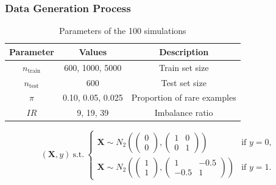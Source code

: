 \documentclass{beamer}
\begin{document}
\begin{frame}
  \frametitle{Data Generation Process}
  
  \small
  \begin{table}[h]
    \centering
    \begin{tabular}{|c|c|c|}
    \hline
    Parameter & Values & Description \\ 
    \hline
    $n_\text{train}$ & 600, 1000, 5000 & Train set size \\  
    $n_\text{test}$ & 600 & Test set size \\
    $\pi$ & 0.10, 0.05, 0.025 & Proportion of rare examples \\
    $IR$ & 9, 19, 39 & Imbalance ratio \\
    \hline
    \end{tabular}
    \caption{Parameters of the 100 simulations}
    \label{table:parameters}
    \end{table}


    \small
    \begin{equation*}
      (\mathbf{X}, y) \ \text{s.t.} \
      \begin{cases} 
          \mathbf{X} \sim N_2\left(
            \begin{pmatrix}
            0 \\ 0
            \end{pmatrix},
            \begin{pmatrix}
            1 & 0 \\ 
            0 & 1
            \end{pmatrix}
            \right) & \text{if } y = 0, \\
          \mathbf{X} \sim N_2\left(
            \begin{pmatrix}
            1 \\ 1
            \end{pmatrix},
            \begin{pmatrix}
            1 & -0.5 \\ 
            -0.5 & 1
            \end{pmatrix}
            \right) & \text{if } y = 1.
      \end{cases}
  \end{equation*}
\end{frame}
\end{document}
